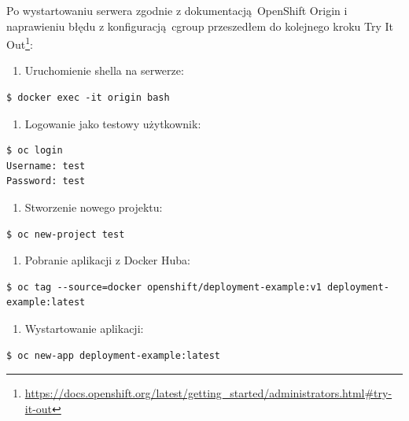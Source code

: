 \documentclass[a4paper,12pt,twoside,openany]{report}
\providecommand{\tightlist}{%
  \setlength{\itemsep}{0pt}\setlength{\parskip}{0pt}}
\DeclareRobustCommand{\href}[2]{#2\footnote{\url{#1}}}
\begin{document}
Po wystartowaniu serwera zgodnie z dokumentacją~OpenShift Origin i
naprawieniu błędu z konfiguracją~cgroup przeszedłem do kolejnego kroku
\href{https://docs.openshift.org/latest/getting_started/administrators.html\#try-it-out}{Try
It Out}:

\begin{enumerate}
\def\labelenumi{\arabic{enumi}.}
\tightlist
\item
  Uruchomienie shella na serwerze:
\end{enumerate}

\begin{lstlisting}
$ docker exec -it origin bash
\end{lstlisting}

\begin{enumerate}
\def\labelenumi{\arabic{enumi}.}
\setcounter{enumi}{1}
\tightlist
\item
  Logowanie jako testowy użytkownik:
\end{enumerate}

\begin{lstlisting}
$ oc login
Username: test
Password: test
\end{lstlisting}

\begin{enumerate}
\def\labelenumi{\arabic{enumi}.}
\setcounter{enumi}{2}
\tightlist
\item
  Stworzenie nowego projektu:
\end{enumerate}

\begin{lstlisting}
$ oc new-project test
\end{lstlisting}

\begin{enumerate}
\def\labelenumi{\arabic{enumi}.}
\setcounter{enumi}{3}
\tightlist
\item
  Pobranie aplikacji z Docker Huba:
\end{enumerate}

\begin{lstlisting}
$ oc tag --source=docker openshift/deployment-example:v1 deployment-example:latest
\end{lstlisting}

\begin{enumerate}
\def\labelenumi{\arabic{enumi}.}
\setcounter{enumi}{4}
\tightlist
\item
  Wystartowanie aplikacji:
\end{enumerate}

\begin{lstlisting}
$ oc new-app deployment-example:latest
\end{lstlisting}
\end{document}
